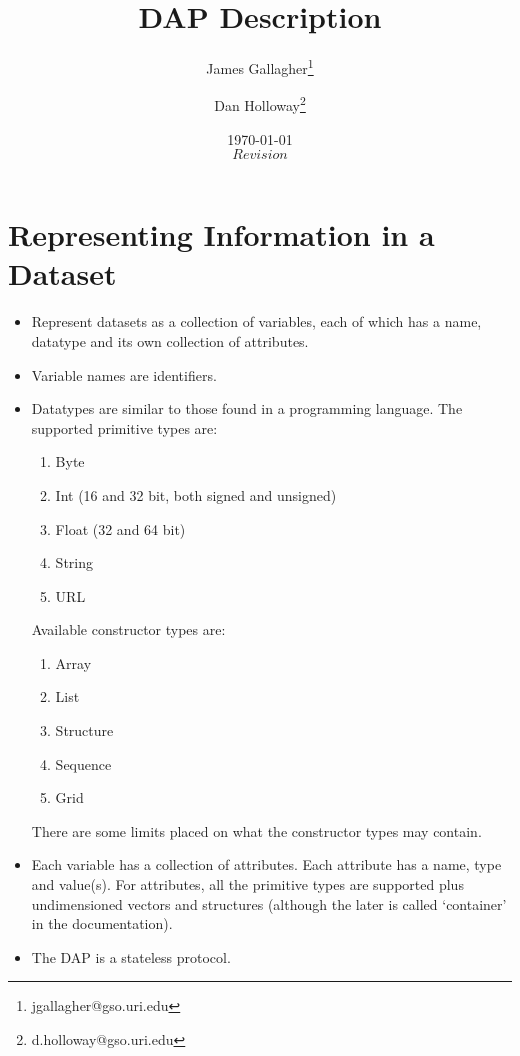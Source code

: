 \documentclass{article}
\begin{document}
\title{DAP Description}
\author{James Gallagher\thanks{jgallagher@gso.uri.edu}
  \and Dan Holloway\thanks{d.holloway@gso.uri.edu}}
\date{\today \\ $Revision$ }

\maketitle
\tableofcontents

\section{Representing Information in a Dataset}
\label{sec:representation}

\begin{itemize}
\item Represent datasets as a collection of variables, each of which has a
  name, datatype and its own collection of attributes.

\item Variable names are identifiers.
  
\item Datatypes are similar to those found in a programming language. The
  supported primitive types are: 
  \begin{enumerate}
  \item Byte
  \item Int (16 and 32 bit, both signed and unsigned)
  \item Float (32 and 64 bit)
  \item String
  \item URL
  \end{enumerate}
  Available constructor types are:
  \begin{enumerate}
  \item Array
  \item List 
  \item Structure
  \item Sequence 
  \item Grid
  \end{enumerate}
  There are some limits placed on what the constructor types may contain.
  
\item Each variable has a collection of attributes. Each attribute has a
  name, type and value(s). For attributes, all the primitive types are
  supported plus undimensioned vectors and structures (although the later is
  called `container' in the documentation).

\item The DAP is a stateless protocol.
\end{itemize}
\end{document}
